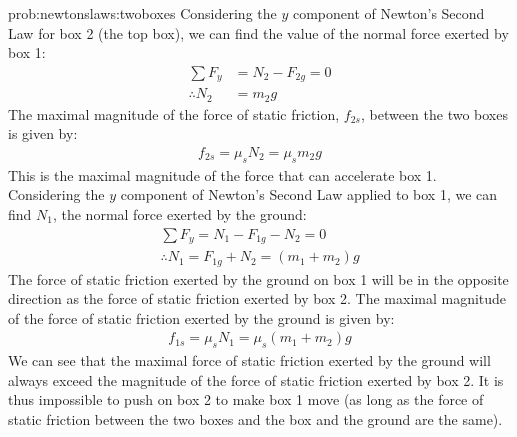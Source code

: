 \begin{solution}{prob:newtonslaws:twoboxes}
Considering the $y$ component of Newton's Second Law for box 2 (the top box), we can find the value of the normal force exerted by box 1:
\begin{align*}
\sum F_y &= N_2 - F_{2g} = 0\\
\therefore N_2 &= m_2 g
\end{align*}
The maximal magnitude of the force of static friction, $f_{2s}$, between the two boxes is given by:
\begin{align*}
f_{2s} = \mu_sN_2 = \mu_s m_2g
\end{align*}
This is the maximal magnitude of the force that can accelerate box 1. Considering the $y$ component of Newton's Second Law applied to box 1, we can find $N_1$, the normal force exerted by the ground:
\begin{align*}
\sum F_y = N_1 - F_{1g} - N_2 = 0\\
\therefore N_1 = F_{1g}+N_2 = (m_1+m_2)g
\end{align*}
The force of static friction exerted by the ground on box 1 will be in the opposite direction as the force of static friction exerted by box 2. The maximal magnitude of the force of static friction exerted by the ground is given by:
\begin{align*}
f_{1s} = \mu_sN_1 = \mu_s (m_1+m_2)g
\end{align*}
We can see that the maximal force of static friction exerted by the ground will always exceed the magnitude of the force of static friction exerted by box 2. It is thus impossible to push on box 2 to make box 1 move (as long as the force of static friction between the two boxes and the box and the ground are the same).
\end{solution}